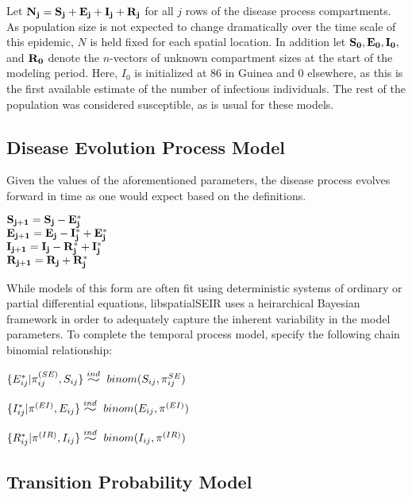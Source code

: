 \documentclass[12pt]{article}
\newcommand{\widesim}[2][1.5]{
      \mathrel{\overset{#2}{\scalebox{#1}[1]{$\sim$}}}
  }
\newcommand \mbreak {\\ \vspace{0.1in}}
\begin{document}
        Let {$\bf{N_j} = \bf{S_j + E_j + I_j + R_j}$} for all $j$ rows of the disease process compartments. As population size is not 
        expected to change dramatically over the time scale of this epidemic, $N$ is held fixed for each spatial location. 
        In addition let ${\bf{S_0, E_0, I_0,}}$ and ${\bf{R_0}}$ denote the $n$-vectors of unknown compartment sizes at the 
        start of the modeling period. Here, $I_0$ is initialized at $86$ in Guinea and $0$ elsewhere, as this is the first available
        estimate of the number of infectious individuals. The rest of the population was considered susceptible, as is usual for these models.  
        

    \vspace{0.15in}
    \subsection{Disease Evolution Process Model}
    Given the values of the aforementioned parameters, the disease process evolves forward in time 
    as one would expect based on the definitions.  
    \begin{center}


        $\bf{S_{j+1}} = \bf{S_j} - \bf{E_j^*}$\mbreak
        $\bf{E_{j+1}} = \bf{E_j} - \bf{I_j^*} + \bf{E_j^*}$\mbreak
        $\bf{I_{j+1}} = \bf{I_j} - \bf{R_j^*} + \bf{I_j^*}$\mbreak
        $\bf{R_{j+1}} = \bf{R_j} + \bf{R_j^*}$\mbreak
    \end{center}
    \vspace{0.15in}

    While models of this form are often fit using deterministic systems of ordinary or partial differential equations, 
    libspatialSEIR uses a heirarchical Bayesian framework in order to adequately capture the inherent variability in the model parameters.
    To complete the temporal process model, specify the following chain binomial relationship: 
    \vspace{0.15in}
    {


        $\{E_{ij}^* | \pi^{(SE)}_{ij}, S_{ij} \} \widesim{ind}\ binom(S_{ij}, \pi^{SE}_{ij})$ \mbreak

        $\{I_{ij}^* | \pi^{(EI)}, E_{ij} \} \widesim{ind}\ binom(E_{ij}, \pi^{(EI)})$\mbreak

        $\{R_{ij}^* | \pi^{(IR)}, I_{ij}\} \widesim{ind}\ binom(I_{ij}, \pi^{(IR)})$\mbreak
    }
\subsection{Transition Probability Model}
\end{document}
